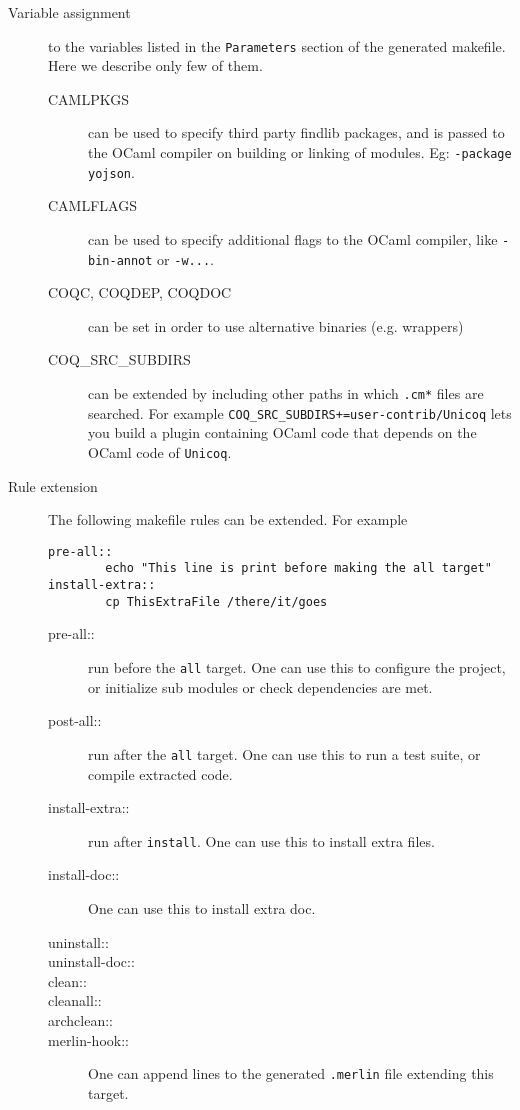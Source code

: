 \begin{description}
  \item[Variable assignment] to the variables listed in the {\tt Parameters}
	  section of the generated makefile.  Here we describe only few of them.
  \begin{description}
  \item[CAMLPKGS] can be used to specify third party findlib packages, and is
	  passed to the OCaml compiler on building or linking of modules.
          Eg: {\tt -package yojson}.
  \item[CAMLFLAGS] can be used to specify additional flags to the OCaml
	  compiler, like {\tt -bin-annot} or {\tt -w...}.
  \item[COQC, COQDEP, COQDOC] can be set in order to use alternative 
	  binaries (e.g. wrappers)
  \item[COQ\_SRC\_SUBDIRS] can be extended by including other paths in which {\tt *.cm*} files are searched. For example {\tt COQ\_SRC\_SUBDIRS+=user-contrib/Unicoq} lets you build a plugin containing OCaml code that depends on the OCaml code of {\tt Unicoq}.
  \end{description}
\item[Rule extension]
  The following makefile rules can be extended. For example
\begin{verbatim}
pre-all::
        echo "This line is print before making the all target"
install-extra::
        cp ThisExtraFile /there/it/goes
\end{verbatim}
  \begin{description}
  \item[pre-all::] run before the {\tt all} target.  One can use this
	  to configure the project, or initialize sub modules or check
	  dependencies are met.
  \item[post-all::] run after the {\tt all} target.  One can use this
	  to run a test suite, or compile extracted code.
  \item[install-extra::] run after {\tt install}.  One can use this
	  to install extra files.
  \item[install-doc::]  One can use this to install extra doc.
  \item[uninstall::] 
  \item[uninstall-doc::]
  \item[clean::]
  \item[cleanall::]
  \item[archclean::]
  \item[merlin-hook::] One can append lines to the generated {\tt .merlin}
	  file extending this target.
  \end{description}
\end{description}

